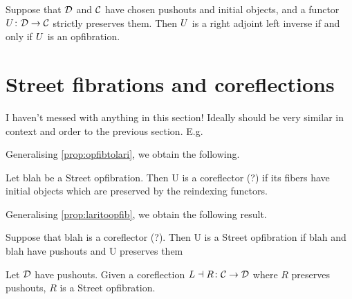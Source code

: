 \documentclass{amsart}
\begin{document}
\begin{thm}\label{thm:mainthm}
Suppose that $\mathcal{D}$ and $\mathcal{C}$ have chosen pushouts and initial objects, and a functor $U\colon\mathcal{D}\to\mathcal{C}$ strictly preserves them. Then $U$ is a right adjoint left inverse if and only if $U$ is an opfibration.
\end{thm}

\section{Street fibrations and coreflections}\label{Streetfibs}


{\chris I haven't messed with anything in this section! Ideally should be very similar in context and order to the previous section. E.g.

Generalising \cref{prop:opfibtolari}, we obtain the following.
\begin{prop}
 Let blah be a Street opfibration. Then U is a coreflector (?) if its fibers have initial objects which are preserved by the reindexing functors.
\end{prop}

Generalising \cref{prop:laritoopfib}, we obtain the following result.

\begin{prop}
 Suppose that blah is a coreflector (?). Then U is a Street opfibration if blah and blah have pushouts and U preserves them 
\end{prop}}
\begin{thm}
	Let $ \mathcal{D} $ have pushouts. Given a coreflection $ L \dashv R \colon \mathcal{C} \to \mathcal{D} $ where $ R $ preserves pushouts, $ R $ is a Street opfibration.
\end{thm}
\end{document}
